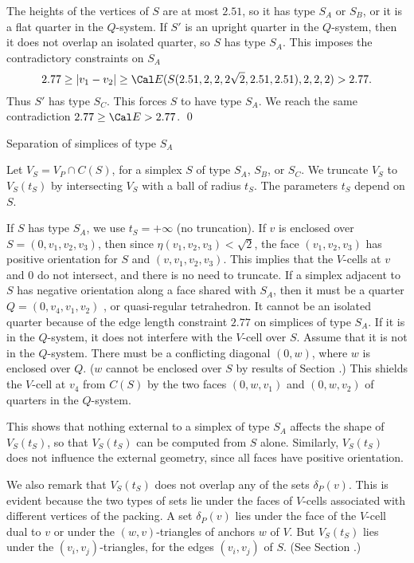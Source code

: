 The heights of the vertices of $S$ are at most $2.51$, so it has type
$S_A$ or $S_B$, or it is a flat quarter in the $Q$-system.
If $S'$ is an upright quarter in the $Q$-system, then it does not
overlap an isolated quarter, so $S$ has type $S_A$.  
This imposes the contradictory constraints on $S_A$
$$2.77\ge |v_1-v_2|\ge\Cal E(S(2.51,2,2,2\sqrt{2},2.51,2.51),2,2,2)>2.77.$$
Thus $S'$ has type $S_C$.  This forces $S$ to have type $S_A$.  We reach
the same contradiction  $2.77\ge \Cal E>2.77$.
\qed
\enddemo

\subhead {} Separation of simplices of type $S_A$ \endsubhead

Let $V_S = V_P\cap C(S)$, for a simplex $S$ of type $S_A$, $S_B$, or $S_C$.
We truncate $V_S$ to $V_S(t_S)$ by intersecting $V_S$ with a 
ball of radius $t_S$.  The parameters $t_S$ depend on $S$.

If $S$ has type $S_A$, we use $t_S=+\infty$ (no truncation).  If
$v$ is enclosed over $S=(0,v_1,v_2,v_3)$, then since 
$\eta(v_1,v_2,v_3)<\sqrt{2}$,
the face $(v_1,v_2,v_3)$ has positive orientation for $S$ and $(v,v_1,v_2,v_3)$.
This implies that the $V$-cells at $v$ and $0$ do not intersect, and
there is no need to truncate.  If a simplex adjacent to $S$ has
negative orientation along a face shared with $S_A$, then it must
be a quarter $Q=(0,v_4,v_1,v_2)$ \cite{F.2.2}, or quasi-regular tetrahedron.  
It cannot be an isolated quarter because
of the edge length constraint $2.77$ on simplices of type $S_A$.
If it is in the $Q$-system, it does not interfere with the $V$-cell over $S$.
Assume that it is not in the $Q$-system.  There must be a conflicting
diagonal $(0,w)$, where $w$ is enclosed over $Q$.  ($w$ cannot be
enclosed over $S$ by results of Section .)  This shields the
$V$-cell at $v_4$ from $C(S)$ by the two faces $(0,w,v_1)$ and $(0,w,v_2)$
of quarters in the $Q$-system.

This shows that nothing external to a simplex of type $S_A$ affects
the shape of 
$V_S(t_S)$, so that $V_S(t_S)$ can be computed from $S$ alone.
Similarly, $V_S(t_S)$ does not influence the external geometry, since
all faces have positive orientation.

We also remark that $V_S(t_S)$ does not overlap any of the sets
$\delta_P(v)$.  This is evident because the two types of sets lie 
under the faces of
$V$-cells associated with different vertices of the packing.
A set $\delta_P(v)$ lies under the face of the $V$-cell dual to $v$
or under the $(w,v)$-triangles of anchors $w$ of $V$.  But
$V_S(t_S)$ lies under the $(v_i,v_j)$-triangles, for the
edges $(v_i,v_j)$ of $S$.  (See Section .)

